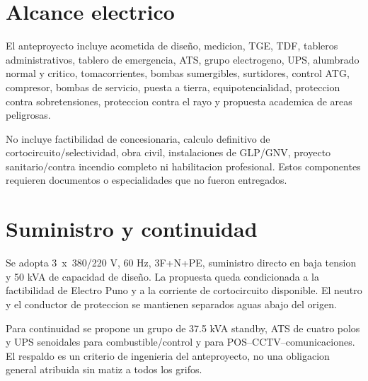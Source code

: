 \section{Alcance electrico}
El anteproyecto incluye acometida de diseño, medicion, TGE, TDF, tableros administrativos, tablero de emergencia, ATS, grupo electrogeno, UPS, alumbrado normal y critico, tomacorrientes, bombas sumergibles, surtidores, control ATG, compresor, bombas de servicio, puesta a tierra, equipotencialidad, proteccion contra sobretensiones, proteccion contra el rayo y propuesta academica de areas peligrosas.

No incluye factibilidad de concesionaria, calculo definitivo de cortocircuito/selectividad, obra civil, instalaciones de GLP/GNV, proyecto sanitario/contra incendio completo ni habilitacion profesional. Estos componentes requieren documentos o especialidades que no fueron entregados.

\section{Suministro y continuidad}
Se adopta 3~x~380/220 V, 60 Hz, 3F+N+PE, suministro directo en baja tension y 50 kVA de capacidad de diseño. La propuesta queda condicionada a la factibilidad de Electro Puno y a la corriente de cortocircuito disponible. El neutro y el conductor de proteccion se mantienen separados aguas abajo del origen.

Para continuidad se propone un grupo de 37.5 kVA standby, ATS de cuatro polos y UPS senoidales para combustible/control y para POS--CCTV--comunicaciones. El respaldo es un criterio de ingenieria del anteproyecto, no una obligacion general atribuida sin matiz a todos los grifos.
